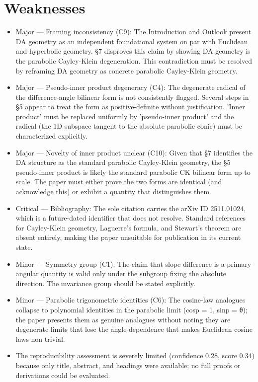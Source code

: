 \documentclass[11pt]{article}
\begin{document}
\section*{Weaknesses}
\begin{itemize}[leftmargin=*]
  \item Major — Framing inconsistency (C9): The Introduction and Outlook present DA geometry as an independent foundational system on par with Euclidean and hyperbolic geometry. §7 disproves this claim by showing DA geometry is the parabolic Cayley-Klein degeneration. This contradiction must be resolved by reframing DA geometry as concrete parabolic Cayley-Klein geometry.
  \item Major — Pseudo-inner product degeneracy (C4): The degenerate radical of the difference-angle bilinear form is not consistently flagged. Several steps in §5 appear to treat the form as positive-definite without justification. 'Inner product' must be replaced uniformly by 'pseudo-inner product' and the radical (the 1D subspace tangent to the absolute parabolic conic) must be characterized explicitly.
  \item Major — Novelty of inner product unclear (C10): Given that §7 identifies the DA structure as the standard parabolic Cayley-Klein geometry, the §5 pseudo-inner product is likely the standard parabolic CK bilinear form up to scale. The paper must either prove the two forms are identical (and acknowledge this) or exhibit a quantity that distinguishes them.
  \item Critical — Bibliography: The sole citation carries the arXiv ID 2511.01024, which is a future-dated identifier that does not resolve. Standard references for Cayley-Klein geometry, Laguerre's formula, and Stewart's theorem are absent entirely, making the paper unsuitable for publication in its current state.
  \item Minor — Symmetry group (C1): The claim that slope-difference is a primary angular quantity is valid only under the subgroup fixing the absolute direction. The invariance group should be stated explicitly.
  \item Minor — Parabolic trigonometric identities (C6): The cosine-law analogues collapse to polynomial identities in the parabolic limit (cosp = 1, sinp = θ); the paper presents them as genuine analogues without noting they are degenerate limits that lose the angle-dependence that makes Euclidean cosine laws non-trivial.
  \item The reproducibility assessment is severely limited (confidence 0.28, score 0.34) because only title, abstract, and headings were available; no full proofs or derivations could be evaluated.
\end{itemize}
\end{document}
